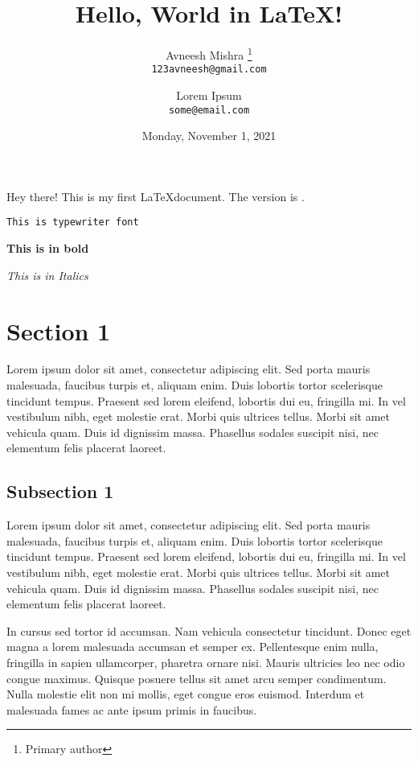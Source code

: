 \documentclass{article}
\title{Hello, World in \LaTeX!}
\author{
    Avneesh Mishra
    \thanks{Primary author} \\
    \texttt{123avneesh@gmail.com}
    \and
    Lorem Ipsum \\
    \texttt{some@email.com}
}
\date{Monday, November 1, 2021}
\begin{document}
    \maketitle
    Hey there! This is my first \LaTeX document. The version is \LaTeXe.

    \texttt{This is typewriter font}

    \textbf{This is in bold}

    \textit{This is in Italics}

    \section{Section 1}
    Lorem ipsum dolor sit amet, consectetur adipiscing elit. Sed porta mauris malesuada, faucibus turpis et, aliquam enim. Duis lobortis tortor scelerisque tincidunt tempus. Praesent sed lorem eleifend, lobortis dui eu, fringilla mi. In vel vestibulum nibh, eget molestie erat. Morbi quis ultrices tellus. Morbi sit amet vehicula quam. Duis id dignissim massa. Phasellus sodales suscipit nisi, nec elementum felis placerat laoreet.

    \subsection{Subsection 1}
    Lorem ipsum dolor sit amet, consectetur adipiscing elit. Sed porta mauris malesuada, faucibus turpis et, aliquam enim. Duis lobortis tortor scelerisque tincidunt tempus. Praesent sed lorem eleifend, lobortis dui eu, fringilla mi. In vel vestibulum nibh, eget molestie erat. Morbi quis ultrices tellus. Morbi sit amet vehicula quam. Duis id dignissim massa. Phasellus sodales suscipit nisi, nec elementum felis placerat laoreet.


    In cursus sed tortor id accumsan. Nam vehicula consectetur tincidunt. Donec eget magna a lorem malesuada accumsan et semper ex. Pellentesque enim nulla, fringilla in sapien ullamcorper, pharetra ornare nisi. Mauris ultricies leo nec odio congue maximus. Quisque posuere tellus sit amet arcu semper condimentum. Nulla molestie elit non mi mollis, eget congue eros euismod. Interdum et malesuada fames ac ante ipsum primis in faucibus.
\end{document}

